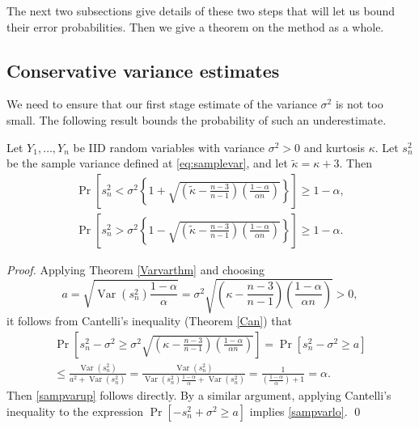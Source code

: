 \documentclass[graybox]{svmult}
\newcommand{\Prob}{\Pr}
\DeclareMathOperator{\var}{Var}
\begin{document}
The next two subsections give details of
these two steps that will let us bound
their error probabilities. Then we give
a theorem on the method as a whole.


\subsection{Conservative variance estimates}

We need to ensure that our first stage estimate of the
variance $\sigma^2$ is not too small. The following
result bounds the probability of such an underestimate.

\begin{lemma}\label{propCant} 
Let $Y_1,\dots,Y_n$ be IID random variables with variance
$\sigma^2>0$ and kurtosis $\kappa$.
Let $s^2_n$ be the sample variance 
defined at \eqref{eq:samplevar}, and let $\tilde\kappa=\kappa+3$.  Then
\begin{subequations} \label{sampvarbd}
\begin{gather}\label{sampvarup}
\Prob\left[s^2_n < \sigma^2 \left\{1 + \sqrt{\left ( \tilde\kappa  - \frac{n-3}{n-1}\right)\left(\frac{1-\alpha}{\alpha n}\right)}\right\} \right] \ge 1 - \alpha, \\
\label{sampvarlo}
\Prob\left[s^2_n > \sigma^2 \left\{1 - \sqrt{\left ( \tilde\kappa  - \frac{n-3}{n-1}\right)\left(\frac{1-\alpha}{\alpha n}\right)}\right\} \right] \ge 1 - \alpha.
\end{gather}
\end{subequations}
\end{lemma}
\begin{proof} Applying Theorem \ref{Varvarthm} and choosing
$$a=\sqrt{\var(s^2_n) \frac{1-\alpha}{\alpha} } = \sigma^2\sqrt{\left(\kappa-\frac{n-3}{n-1}\right)\left(\frac{1-\alpha}{\alpha n}\right)} >0,
$$
it follows from Cantelli's inequality (Theorem  \ref{Can})  that
\begin{multline*}
\Prob\left[s^2_n-\sigma^2 \geq
\sigma^2\sqrt{\left(\kappa-\frac{n-3}{n-1}\right)\left(\frac{1-\alpha}{\alpha n}\right)} \right]  = \Prob\left[s^2_n-\sigma^2 \geq
a \right]\\
 \leq \frac{\var(s^2_n)}{a^2+\var(s^2_n)} 
=\frac{\var(s^2_n)}{\var(s^2_n) \frac{1-\alpha}{\alpha}+\var(s^2_n)}  
=\frac{1}{\left(\frac{1-\alpha}{\alpha}\right)+1}=\alpha.
\end{multline*}
Then \eqref{sampvarup} follows directly.  By a similar argument, applying Cantelli's inequality to the expression $\Prob\left[-s^2_n+\sigma^2 \ge a \right]$ implies  \eqref{sampvarlo}. \qed
\end{proof}
\end{document}

